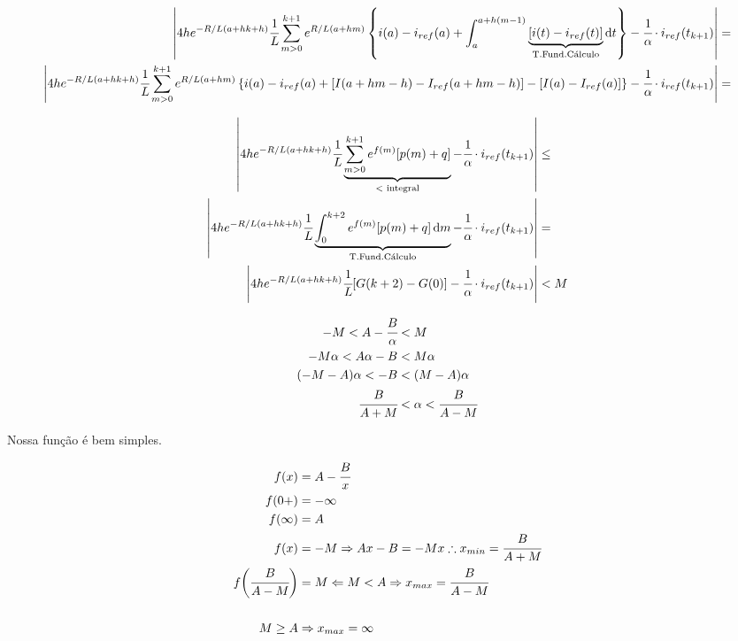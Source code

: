 \documentclass[11pt]{article}
\begin{document}
\footnotesize

\begin{align}
  \left\vert 4h e^{-R/L (a + hk + h)}\cfrac{1}{L}\sum_{m > 0}^{k + 1} e^{R/L (a + hm)}  \left\{ i(a) - i_{ref}(a) + \int_a^{a + h(m - 1)} \underbrace{[i(t) - i_{ref}(t)]}_{\text{T.Fund.C\'alculo}} \mathrm{d}t \right\} - \cfrac{1}{\alpha} \cdot i_{ref}(t_{k+1}) \right\vert &=  \\
  \left\vert 4h e^{-R/L (a + hk + h)}\cfrac{1}{L}\sum_{m > 0}^{k + 1} e^{R/L (a + hm)}  \left\{ i(a) - i_{ref}(a) + [I(a + hm - h) - I_{ref}(a + hm - h)] - [I(a) - I_{ref}(a)] \right\} - \cfrac{1}{\alpha} \cdot i_{ref}(t_{k+1}) \right\vert &=
\end{align}

\normalsize

\begin{align}
  \left\vert 4h e^{-R/L (a + hk + h)}\cfrac{1}{L} \underbrace{\sum_{m > 0}^{k + 1} e^{f(m)} [p(m) + q]}_{<\text{ integral}}  - \cfrac{1}{\alpha} \cdot i_{ref}(t_{k+1}) \right\vert &\le  \\
  \left\vert 4h e^{-R/L (a + hk + h)}\cfrac{1}{L} \underbrace{\int_0^{k + 2} e^{f(m)} [p(m) + q] \,\mathrm{d}m}_{\text{T.Fund.C\'alculo}}  - \cfrac{1}{\alpha} \cdot i_{ref}(t_{k+1}) \right\vert &=  \\
  \left\vert 4h e^{-R/L (a + hk + h)}\cfrac{1}{L} [G(k+2) - G(0)]  - \cfrac{1}{\alpha} \cdot i_{ref}(t_{k+1}) \right\vert &< M
\end{align}

\begin{align}
  - M < A - \cfrac{B}{\alpha} &< M \\
  - M\alpha < A\alpha - B &< M \alpha \\
  (- M - A)\alpha < - B &< (M - A) \alpha \\
  \cfrac{B}{A + M} &< \alpha < \cfrac{B}{A - M}
\end{align}

Nossa fun\c{c}\~ao \'e bem simples.

\begin{align}
 f(x) &= A - \cfrac{B}{x} \\
 f(0+) &= - \infty \\
 f(\infty) &= A \\
 f(x) &= - M \Rightarrow Ax - B = - Mx \therefore x_{min} = \cfrac{B}{A + M} \\
 f\bigg(\cfrac{B}{A - M}\bigg) &= M \Leftarrow M < A \Rightarrow x_{max} = \cfrac{B}{A - M} \\
 \\
 M \ge A &\Rightarrow x_{max} = \infty
\end{align}
\end{document}
